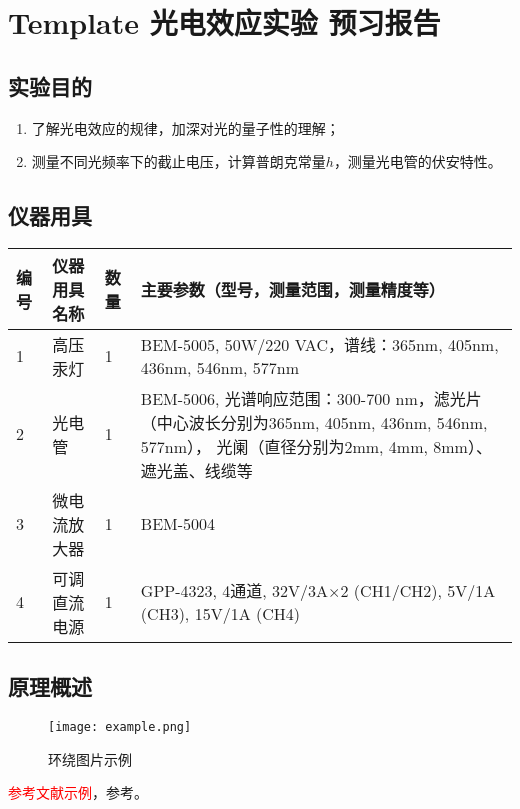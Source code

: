 \documentclass[dvipsnames, svgnames,a4paper,11pt]{article}
\begin{document}
\clearpage
\tableofcontents
\clearpage

\setcounter{section}{0}
\section{Template 光电效应实验 \quad\heiti 预习报告}
	
\subsection{实验目的}
\begin{enumerate}
	\item 了解光电效应的规律，加深对光的量子性的理解；
	\item 测量不同光频率下的截止电压，计算普朗克常量$h$，测量光电管的伏安特性。
\end{enumerate}

\subsection{仪器用具}
\begin{table}[htbp]
	\centering
	\renewcommand\arraystretch{1.6}
	\begin{tabular}{p{}|p{}|p{}|p{}}
	\hline
	编号& 仪器用具名称 & 数量 &  主要参数（型号，测量范围，测量精度等） \\
	\hline
	1&高压汞灯 &1 & BEM-5005, 50W/220 VAC，谱线：365nm, 405nm, 436nm, 546nm, 577nm\\

	2&光电管 &1 & BEM-5006, 光谱响应范围：300-700 nm，滤光片（中心波长分别为365nm, 405nm, 436nm, 546nm, 577nm），
	光阑（直径分别为2mm, 4mm, 8mm）、遮光盖、线缆等 \\
	
	3&微电流放大器 & 1 &BEM-5004 \\
	
	4&可调直流电源&1 & GPP-4323, 4通道, 32V/3A$\times$2 (CH1/CH2), 5V/1A (CH3), 15V/1A (CH4)\\
	\hline
\end{tabular}
\end{table}

\subsection{原理概述}
\begin{wrapfigure}{l}{0cm} %
	\centering
	\texttt{[image: example.png]}
	\caption{环绕图片示例}
\end{wrapfigure}
\textcolor{red}{参考文献示例}，参考\cite{test1,test2}。
\end{document}
